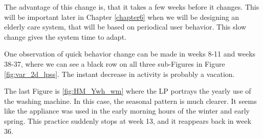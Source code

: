 The advantage of this change is, that it takes a few weeks before it changes. 
This will be important later in Chapter \ref{chapter6} when we will be designing an elderly care system, that will be based on periodical user behavior.
This slow change gives the system time to adapt. 

One observation of quick behavior change can be made in weeks 8-11 and weeks 38-37, where we can see a black row on all three sub-Figures in Figure \ref{fig:var_2d_lpss}.
The instant decrease in activity is probably a vacation.

The last Figure is \ref{fig:HM_Ywh_wm} where the LP portrays the yearly use of the washing machine.
In this case, the seasonal pattern is much clearer. 
It seems like the appliance was used in the early morning hours of the winter and early spring.
This practice suddenly stops at week 13, and it reappears back in week 36.
  
